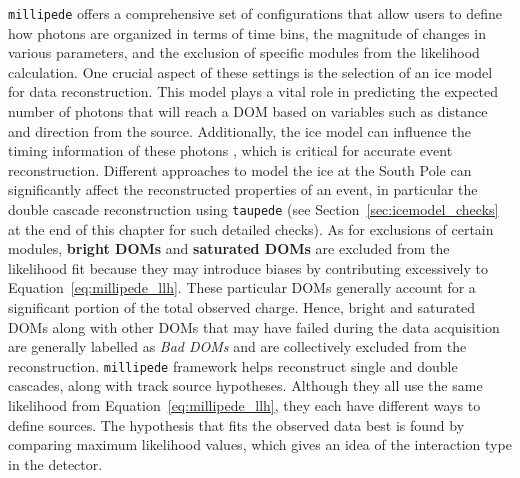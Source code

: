 \texttt{millipede} offers a comprehensive set of configurations that allow users to define how photons are organized in terms of time bins, the magnitude of changes in various parameters, and the exclusion of specific modules from the likelihood calculation. One crucial aspect of these settings is the selection of an ice model for data reconstruction. This model plays a vital role in predicting the expected number of photons that will reach a DOM based on variables such as distance and direction from the source. Additionally, the ice model can influence the timing information of these photons , which is critical for accurate event reconstruction. Different approaches to model the ice at the South Pole can significantly affect the reconstructed properties of an event, in particular the double cascade reconstruction using \texttt{taupede} (see Section~\ref{sec:icemodel_checks} at the end of this chapter for such detailed checks). As for exclusions of certain modules, \textbf{bright DOMs} and \textbf{saturated DOMs} are excluded from the likelihood fit because they may introduce biases by contributing excessively to Equation~\ref{eq:millipede_llh}. These particular DOMs generally account for a significant portion of the total observed charge. Hence, bright and saturated DOMs along with other DOMs that may have failed during the data acquisition are generally labelled as \emph{Bad DOMs} and are collectively excluded from the reconstruction. \texttt{millipede} framework helps reconstruct single and double cascades, along with track source hypotheses. Although they all use the same likelihood from Equation~\ref{eq:millipede_llh}, they each have different ways to define sources. The hypothesis that fits the observed data best is found by comparing maximum likelihood values, which gives an idea of the interaction type in the detector.

